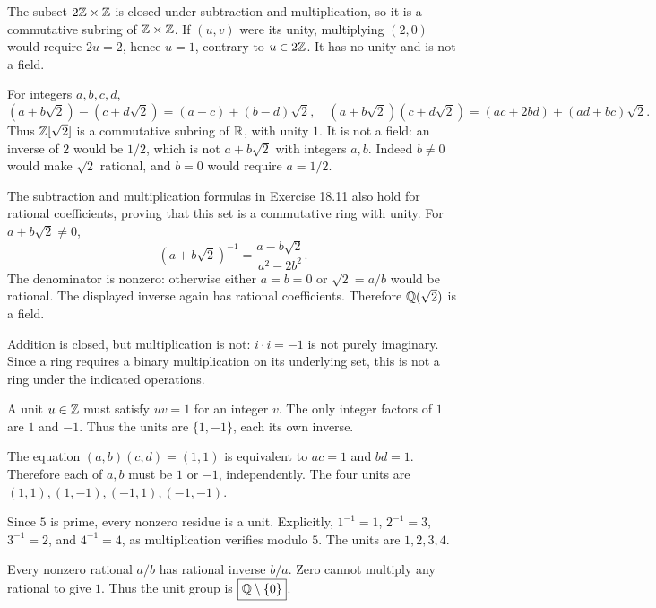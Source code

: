 The subset $2\mathbb{Z}\times\mathbb{Z}$ is closed under subtraction and multiplication, so it is a commutative subring of $\mathbb{Z}\times\mathbb{Z}$. If $(u,v)$ were its unity, multiplying $(2,0)$ would require $2u=2$, hence $u=1$, contrary to $u\in2\mathbb{Z}$. It has no unity and is not a field.

For integers $a,b,c,d$,
\[(a+b\sqrt2)-(c+d\sqrt2)=(a-c)+(b-d)\sqrt2,
\quad (a+b\sqrt2)(c+d\sqrt2)=(ac+2bd)+(ad+bc)\sqrt2.\]
Thus $\mathbb{Z}[\sqrt2]$ is a commutative subring of $\mathbb{R}$, with unity $1$. It is not a field: an inverse of $2$ would be $1/2$, which is not $a+b\sqrt2$ with integers $a,b$. Indeed $b\ne0$ would make $\sqrt2$ rational, and $b=0$ would require $a=1/2$.

The subtraction and multiplication formulas in Exercise 18.11 also hold for rational coefficients, proving that this set is a commutative ring with unity. For $a+b\sqrt2\ne0$,
\[(a+b\sqrt2)^{-1}=\frac{a-b\sqrt2}{a^2-2b^2}.\]
The denominator is nonzero: otherwise either $a=b=0$ or $\sqrt2=a/b$ would be rational. The displayed inverse again has rational coefficients. Therefore $\mathbb{Q}(\sqrt2)$ is a field.

Addition is closed, but multiplication is not: $i\cdot i=-1$ is not purely imaginary. Since a ring requires a binary multiplication on its underlying set, this is not a ring under the indicated operations.

A unit $u\in\mathbb{Z}$ must satisfy $uv=1$ for an integer $v$. The only integer factors of $1$ are $1$ and $-1$. Thus the units are $\boxed{\{1,-1\}}$, each its own inverse.

The equation $(a,b)(c,d)=(1,1)$ is equivalent to $ac=1$ and $bd=1$. Therefore each of $a,b$ must be $1$ or $-1$, independently. The four units are $\boxed{(1,1),(1,-1),(-1,1),(-1,-1)}$.

Since $5$ is prime, every nonzero residue is a unit. Explicitly, $1^{-1}=1$, $2^{-1}=3$, $3^{-1}=2$, and $4^{-1}=4$, as multiplication verifies modulo $5$. The units are $\boxed{1,2,3,4}$.

Every nonzero rational $a/b$ has rational inverse $b/a$. Zero cannot multiply any rational to give $1$. Thus the unit group is $\boxed{\mathbb{Q}\setminus\{0\}}$.

